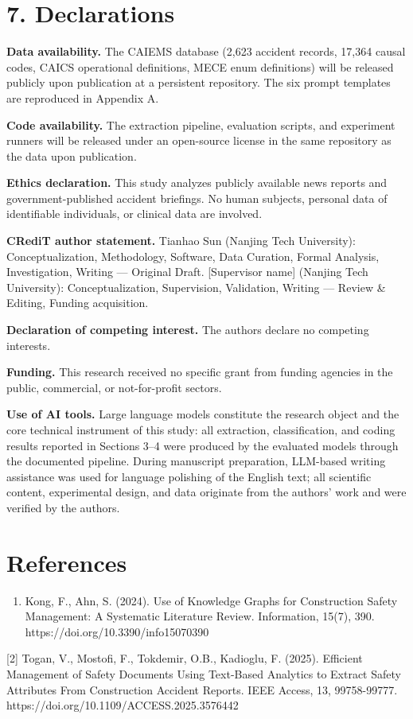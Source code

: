 \documentclass[11pt]{article}
\begin{document}
\section{7. Declarations}
\textbf{Data availability.} The CAIEMS database (2,623 accident records, 17,364 causal codes, CAICS operational definitions, MECE enum definitions) will be released publicly upon publication at a persistent repository. The six prompt templates are reproduced in Appendix A.

\textbf{Code availability.} The extraction pipeline, evaluation scripts, and experiment runners will be released under an open-source license in the same repository as the data upon publication.

\textbf{Ethics declaration.} This study analyzes publicly available news reports and government-published accident briefings. No human subjects, personal data of identifiable individuals, or clinical data are involved.

\textbf{CRediT author statement.} Tianhao Sun (Nanjing Tech University): Conceptualization, Methodology, Software, Data Curation, Formal Analysis, Investigation, Writing --- Original Draft. [Supervisor name] (Nanjing Tech University): Conceptualization, Supervision, Validation, Writing --- Review \& Editing, Funding acquisition.

\textbf{Declaration of competing interest.} The authors declare no competing interests.

\textbf{Funding.} This research received no specific grant from funding agencies in the public, commercial, or not-for-profit sectors.

\textbf{Use of AI tools.} Large language models constitute the research object and the core technical instrument of this study: all extraction, classification, and coding results reported in Sections 3--4 were produced by the evaluated models through the documented pipeline. During manuscript preparation, LLM-based writing assistance was used for language polishing of the English text; all scientific content, experimental design, and data originate from the authors' work and were verified by the authors.

\section*{References}
\begin{enumerate}
\item Kong, F., Ahn, S. (2024). Use of Knowledge Graphs for Construction Safety Management: A Systematic Literature Review. Information, 15(7), 390. https://doi.org/10.3390/info15070390
\end{enumerate}
[2] Togan, V., Mostofi, F., Tokdemir, O.B., Kadioglu, F. (2025). Efficient Management of Safety Documents Using Text-Based Analytics to Extract Safety Attributes From Construction Accident Reports. IEEE Access, 13, 99758-99777. https://doi.org/10.1109/ACCESS.2025.3576442
\end{document}
